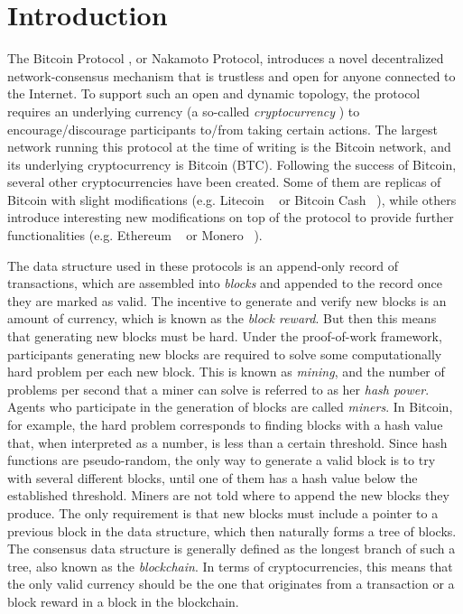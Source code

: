 
\section{Introduction}

The Bitcoin Protocol \cite{Bitcoin,DBLP:books/daglib/0040621,NC17}, or Nakamoto Protocol, introduces a novel decentralized network-consensus mechanism that is trustless and open for anyone connected to the Internet. To support such an open and dynamic topology, the protocol requires an underlying currency (a so-called \emph{cryptocurrency} \cite{NC17}) to encourage/discourage participants to/from taking certain actions. The largest network running this protocol at the time of writing is the Bitcoin network, and its underlying cryptocurrency is Bitcoin (BTC). Following the success of Bitcoin, several other cryptocurrencies have been created. Some of them are replicas of Bitcoin with slight modifications (e.g. Litecoin%
~\cite{Litecoin} 
or Bitcoin Cash%
~\cite{Bcash}), 
while others introduce interesting new modifications on top of the protocol to provide further functionalities 
(e.g. Ethereum%
~\cite{Ethereum,E17} 
or Monero%
~\cite{Monero}).

The data structure used in these protocols is an append-only record of transactions, which are assembled into \emph{blocks} and appended to the record once they 
are marked as valid. The incentive to generate and verify new blocks is an amount of currency, which is known as the \emph{block reward}. But then this means that generating 
new blocks must be hard. Under the proof-of-work framework, participants generating new blocks are required to solve some computationally hard problem per each new block.  This is known as \emph{mining}, and the number of problems per second that a miner can solve is referred to as her \emph{hash power}. Agents who participate in the generation of blocks are called \emph{miners}. In Bitcoin, for example, the hard problem corresponds to finding blocks with a hash value that, when interpreted as a number, is less than a certain threshold. Since hash functions are pseudo-random, the only way to generate a valid block is to try with several different blocks, until one of them has a hash value below the established threshold. 
Miners are not told where to append the new blocks they produce. The only requirement is that new blocks must include a pointer to a previous block in the data structure, 
which then naturally forms a tree of blocks. The consensus data structure is generally defined as the longest branch of such a tree, also known as the \emph{blockchain}. In terms of cryptocurrencies, this means that the only valid currency should be the one that originates from a transaction or a block reward in a block in the blockchain. 

